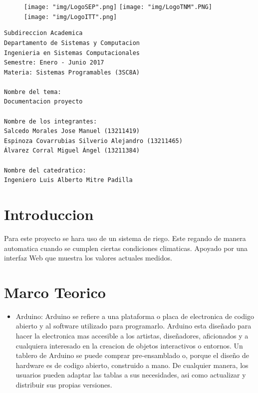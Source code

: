 \documentclass{article}
\begin{document}
\begin{figure}[!htb]
	\texttt{[image: "img/LogoSEP".png]}
\endminipage\hfill
{}
	\texttt{[image: "img/LogoTNM".PNG]}
\endminipage\hfill
{}
	\texttt{[image: "img/LogoITT".png]}
\endminipage\hfill
\end{figure}

\begingroup
\LARGE
\begin{verbatim}
Subdireccion Academica
Departamento de Sistemas y Computacion
Ingenieria en Sistemas Computacionales
Semestre: Enero - Junio 2017
Materia: Sistemas Programables (3SC8A)

Nombre del tema:
Documentacion proyecto

Nombre de los integrantes:
Salcedo Morales Jose Manuel (13211419)
Espinoza Covarrubias Silverio Alejandro (13211465)
Álvarez Corral Miguel Ángel (13211384)

Nombre del catedratico:
Ingeniero Luis Alberto Mitre Padilla

\end{verbatim}
\endgroup

\newpage
\tableofcontents

\newpage
\section{Introduccion}
Para este proyecto se hara uso de un sistema de riego.
\newline Este regando de manera automatica cuando se cumplen ciertas condiciones climaticas.
\newline Apoyado por una interfaz Web que muestra los valores actuales medidos.

\section{Marco Teorico}
\begin{itemize}
	\item Arduino: Arduino se refiere a una plataforma o placa de electronica de codigo abierto y al software utilizado para programarlo. Arduino esta diseñado para hacer la electronica mas accesible a los artistas, diseñadores, aficionados y a cualquiera interesado en la creacion de objetos interactivos o entornos. Un tablero de Arduino se puede comprar pre-ensamblado o, porque el diseño de hardware es de codigo abierto, construido a mano. De cualquier manera, los usuarios pueden adaptar las tablas a sus necesidades, asi como actualizar y distribuir sus propias versiones.
\end{itemize}
\end{document}
